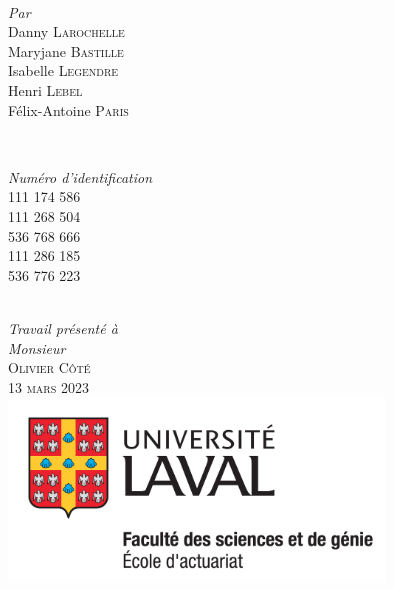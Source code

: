 \begin{titlepage}
\HRule \\[2cm]
\begin{minipage}{0.4\textwidth}
    \begin{flushleft} \large
    \emph{Par}\\
        Danny \textsc{Larochelle}\\
        Maryjane \textsc{Bastille}\\
        Isabelle \textsc{Legendre}\\
        Henri \textsc{Lebel}\\
        Félix-Antoine \textsc{Paris}
    \end{flushleft}
\end{minipage}
~%
\begin{minipage}{0.4\textwidth}
    \begin{flushright} \large
    \emph{Numéro d'identification}\\
        111 174 586\\
        111 268 504\\
        536 768 666\\
        111 286 185\\
        536 776 223
    \end{flushright}
\end{minipage} \\[1.0cm]
\emph{Travail présenté à} \\
\emph{Monsieur} \\[0.1cm]
\textsc{\Large Olivier} \textsc{Côté}\\[1.0cm]
\textsc{\large 13 mars 2023}\\[1cm] %

\includegraphics[width = 10cm]{ul-actuariat}\\[1.5cm]
 
\vfill %

\end{titlepage}
%